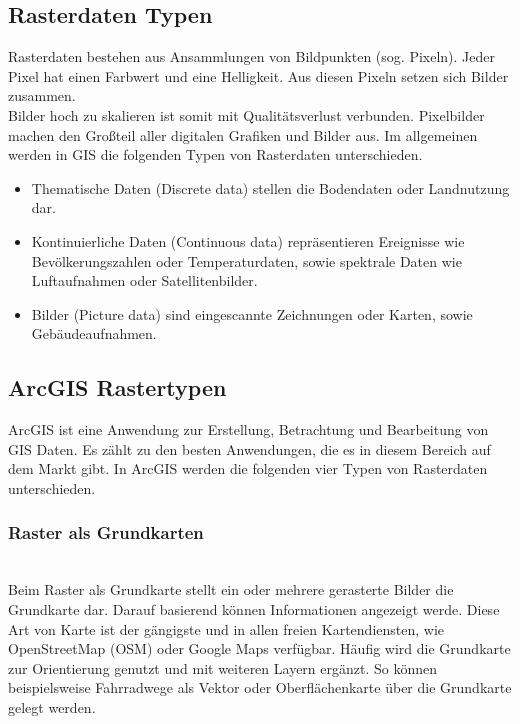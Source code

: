 \documentclass[10pt,conference,compsocconf]{IEEEtran}
\begin{document}
\subsection{Rasterdaten Typen}
Rasterdaten bestehen aus Ansammlungen von Bildpunkten (sog. Pixeln). Jeder Pixel hat einen Farbwert und eine Helligkeit. Aus diesen Pixeln setzen sich Bilder zusammen.\\
Bilder hoch zu skalieren ist somit mit Qualitätsverlust verbunden. Pixelbilder machen den Großteil aller digitalen Grafiken und Bilder aus. Im allgemeinen werden in GIS die folgenden Typen von Rasterdaten unterschieden\cite{mariuszMaster}.

\begin{itemize}
  \item Thematische Daten (Discrete data) stellen die Bodendaten oder Landnutzung dar.
  \item Kontinuierliche Daten (Continuous data) repräsentieren Ereignisse wie Bevölkerungszahlen oder Temperaturdaten, sowie spektrale Daten wie Luftaufnahmen oder Satellitenbilder.
  \item Bilder (Picture data) sind eingescannte Zeichnungen oder Karten, sowie Gebäudeaufnahmen.\\
\end{itemize}

\subsection{ArcGIS Rastertypen}
ArcGIS ist eine Anwendung zur Erstellung, Betrachtung und Bearbeitung von GIS Daten. Es zählt zu den besten Anwendungen, die es in diesem Bereich auf dem Markt gibt. In ArcGIS werden die folgenden vier Typen von Rasterdaten unterschieden.\\

\subsubsection{Raster als Grundkarten}\hspace*{\fill} \\
\label{sub:raster_grundkarte}Beim Raster als Grundkarte stellt ein oder mehrere gerasterte Bilder die Grundkarte dar. Darauf basierend können Informationen angezeigt werde. Diese Art von Karte ist der gängigste und in allen freien Kartendiensten, wie OpenStreetMap (OSM) oder Google Maps verfügbar. Häufig wird die Grundkarte zur Orientierung genutzt und mit weiteren Layern ergänzt. So können beispielsweise Fahrradwege als Vektor oder Oberflächenkarte über die Grundkarte gelegt werden.
\end{document}
